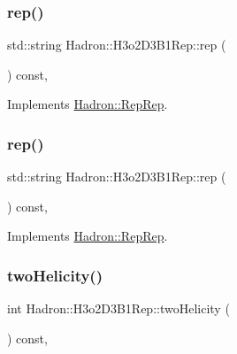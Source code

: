 \subsubsection{\texorpdfstring{rep()}{rep()}\hspace{0.1cm}{\footnotesize\ttfamily [4/5]}}
{\footnotesize\ttfamily std\+::string Hadron\+::\+H3o2\+D3\+B1\+Rep\+::rep (\begin{DoxyParamCaption}{ }\end{DoxyParamCaption}) const\hspace{0.3cm}{\ttfamily [inline]}, {\ttfamily [virtual]}}



Implements \mbox{\hyperlink{structHadron_1_1RepRep_ab3213025f6de249f7095892109575fde}{Hadron\+::\+Rep\+Rep}}.

\mbox{\label{structHadron_1_1H3o2D3B1Rep_acf8f745ca578c355ecbb4097e8c0ce39}} 
\subsubsection{\texorpdfstring{rep()}{rep()}\hspace{0.1cm}{\footnotesize\ttfamily [5/5]}}
{\footnotesize\ttfamily std\+::string Hadron\+::\+H3o2\+D3\+B1\+Rep\+::rep (\begin{DoxyParamCaption}{ }\end{DoxyParamCaption}) const\hspace{0.3cm}{\ttfamily [inline]}, {\ttfamily [virtual]}}



Implements \mbox{\hyperlink{structHadron_1_1RepRep_ab3213025f6de249f7095892109575fde}{Hadron\+::\+Rep\+Rep}}.

\mbox{\label{structHadron_1_1H3o2D3B1Rep_a1052c3969643f837adfe2d8df8e0b1ce}} 
\subsubsection{\texorpdfstring{twoHelicity()}{twoHelicity()}\hspace{0.1cm}{\footnotesize\ttfamily [1/3]}}
{\footnotesize\ttfamily int Hadron\+::\+H3o2\+D3\+B1\+Rep\+::two\+Helicity (\begin{DoxyParamCaption}{ }\end{DoxyParamCaption}) const\hspace{0.3cm}{\ttfamily [inline]}, {\ttfamily [virtual]}}

